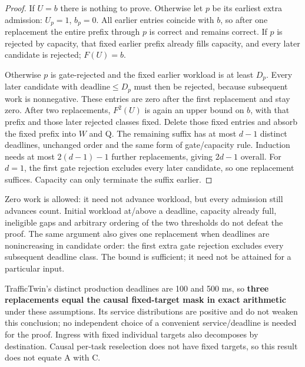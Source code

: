 \documentclass[12pt,a4paper]{article}
\begin{document}
\begin{proof}

If $U=b$ there is nothing to prove. Otherwise let $p$ be its earliest extra admission: $U_p=1$, $b_p=0$. All earlier entries coincide with $b$, so after one replacement the entire prefix through $p$ is correct and remains correct. If $p$ is rejected by capacity, that fixed earlier prefix already fills capacity, and every later candidate is rejected; $F(U)=b$.

Otherwise $p$ is gate-rejected and the fixed earlier workload is at least $D_p$. Every later candidate with $\text{deadline}\leq D_p$ must then be rejected, because subsequent work is nonnegative. These entries are zero after the first replacement and stay zero. After two replacements, $F^{2}(U)$ is again an upper bound on $b$, with that prefix and those later rejected classes fixed. Delete those fixed entries and absorb the fixed prefix into $W$ and Q. The remaining suffix has at most $d-1$ distinct deadlines, unchanged order and the same form of gate/capacity rule. Induction needs at most $2(d-1)-1$ further replacements, giving $2d-1$ overall. For $d=1$, the first gate rejection excludes every later candidate, so one replacement suffices. Capacity can only terminate the suffix earlier.

\end{proof}

Zero work is allowed: it need not advance workload, but every admission still advances count. Initial workload at/above a deadline, capacity already full, ineligible gaps and arbitrary ordering of the two thresholds do not defeat the proof. The same argument also gives one replacement when deadlines are nonincreasing in candidate order: the first extra gate rejection excludes every subsequent deadline class. The bound is sufficient; it need not be attained for a particular input.

TrafficTwin's distinct production deadlines are 100 and 500 ms, so \textbf{three replacements equal the causal fixed-target mask in exact arithmetic} under these assumptions. Its service distributions are positive and do not weaken this conclusion; no independent choice of a convenient service/deadline is needed for the proof. Ingress with fixed individual targets also decomposes by destination. Causal per-task reselection does not have fixed targets, so this result does not equate A with C.
\end{document}
